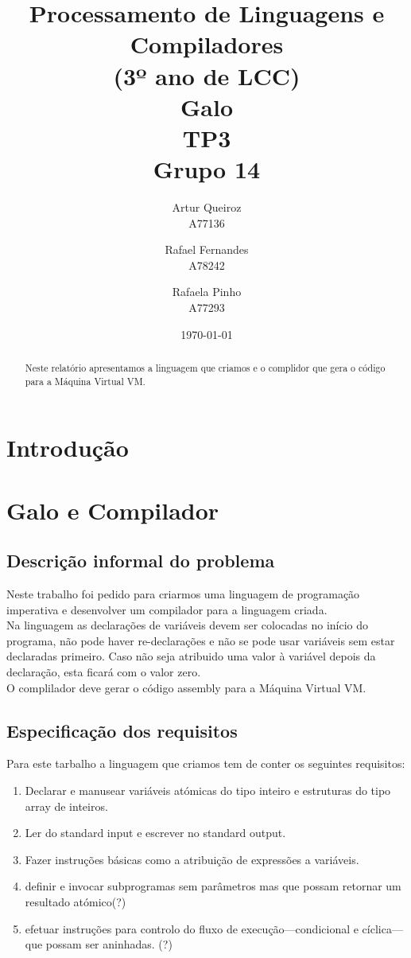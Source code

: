 \documentclass{report}
\title{Processamento de Linguagens e Compiladores\\ (3º ano de LCC)\\ \textbf{Galo}\\ TP3\\ Grupo 14}
\author{Artur Queiroz\\ A77136 \and  Rafael Fernandes\\ A78242 \and Rafaela Pinho\\ A77293 }
\date{\today}
\begin{document}
	
\maketitle
	

\begin{abstract}
	Neste relatório apresentamos a linguagem que criamos e o complidor que gera o código para a Máquina Virtual VM.
\end{abstract}

\tableofcontents

\chapter{Introdução} \label{intro}
\indent

 
\chapter{Galo e Compilador} \label{fi}
\section{Descrição informal do problema}
\indent
Neste trabalho foi pedido para criarmos uma linguagem de programação imperativa e desenvolver um compilador para a linguagem criada.\\
\indent
Na linguagem as declarações de variáveis devem ser colocadas no início do programa, não pode haver re-declarações e não se pode usar variáveis sem estar declaradas primeiro. Caso não seja atribuido uma valor à variável depois da declaração, esta ficará com o valor zero.\\
\indent  	
O complilador deve gerar o código assembly para a Máquina Virtual VM.

\section{Especificação dos requisitos}
\indent
Para este tarbalho a linguagem que criamos tem de conter os seguintes requisitos:
\begin{enumerate}[1)]
	\item Declarar e manusear variáveis atómicas do tipo inteiro e estruturas do tipo array de inteiros.\\
	\item Ler do standard input e escrever no standard output.\\
	\item Fazer instruções básicas como a atribuição de expressões a variáveis.\\
	\item definir e invocar subprogramas sem parâmetros mas que possam retornar um resultado atómico(?)
	\item efetuar instruções para controlo do fluxo de execução—condicional e cíclica—que possam ser aninhadas. (?)
\end{enumerate}
\end{document}
